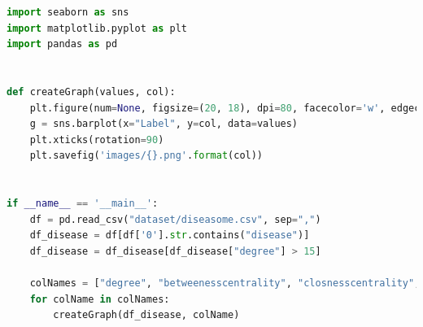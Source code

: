 \documentclass{uimppracticas}
\begin{document}
\begin{lstlisting}[language=Python, basicstyle=\small]
import seaborn as sns
import matplotlib.pyplot as plt
import pandas as pd


def createGraph(values, col):
	plt.figure(num=None, figsize=(20, 18), dpi=80, facecolor='w', edgecolor='r')
	g = sns.barplot(x="Label", y=col, data=values)
	plt.xticks(rotation=90)
	plt.savefig('images/{}.png'.format(col))


if __name__ == '__main__':
	df = pd.read_csv("dataset/diseasome.csv", sep=",")
	df_disease = df[df['0'].str.contains("disease")]
	df_disease = df_disease[df_disease["degree"] > 15]
	
	colNames = ["degree", "betweenesscentrality", "closnesscentrality", "eigencentrality"]
	for colName in colNames:
		createGraph(df_disease, colName)
\end{lstlisting}

\renewcommand{\refname}{Bibliografía}


\end{document}
